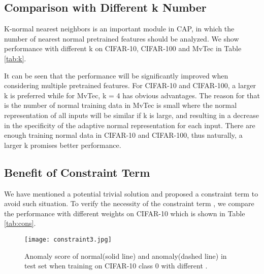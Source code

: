 \documentclass{article}
\begin{document}
\subsection{Comparison with Different k Number}

K-normal nearest neighbors is an important module in CAP, in which the number of nearest normal pretrained features should be analyzed. We show performance with different k on CIFAR-10, CIFAR-100 and MvTec in Table \ref{tab:k}.


It can be seen that the performance will be significantly improved when considering multiple pretrained features. For CIFAR-10 and CIFAR-100, a larger k is preferred while for MvTec, k = 4 has obvious advantages. The reason for that is the number of normal training data in MvTec is small where the normal representation of all inputs will be similar if k is large, and resulting in a decrease in the specificity of the adaptive normal representation for each input. There are enough training normal data in CIFAR-10 and CIFAR-100, thus naturally, a larger k promises better performance.

\subsection{Benefit of Constraint Term}
\label{sec:constraint}
We have mentioned a potential trivial solution and proposed a constraint term to avoid such situation. To verify the necessity of the constraint term , we compare the performance with different weights  on CIFAR-10 which is shown in Table \ref{tab:cons}.

\begin{table}[t]
\centering
\caption{Anomaly detection performance on CIFAR-10 with different weights  of constraint term.}
\label{tab:cons}
\end{table}

\begin{figure}[!t]
	\centering
	\texttt{[image: constraint3.jpg]}
	\caption{Anomaly score of normal(solid line) and anomaly(dashed line) in test set when training on CIFAR-10 class 0 with different .}
	\label{fig:cons1}
\end{figure}
\end{document}
